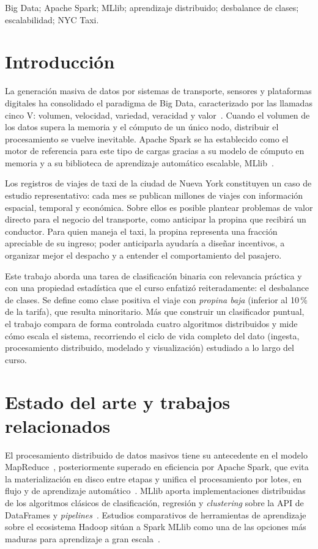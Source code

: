\documentclass[conference]{IEEEtran}
\begin{document}
\begin{IEEEkeywords}
Big Data; Apache Spark; MLlib; aprendizaje distribuido; desbalance de clases;
escalabilidad; NYC Taxi.
\end{IEEEkeywords}

\section{Introducción}
La generación masiva de datos por sistemas de transporte, sensores y plataformas
digitales ha consolidado el paradigma de Big Data, caracterizado por las llamadas
cinco V: volumen, velocidad, variedad, veracidad y valor~\cite{gandomi2015beyond}.
Cuando el volumen de los datos supera la memoria y el cómputo de un único nodo,
distribuir el procesamiento se vuelve inevitable. Apache Spark se ha establecido
como el motor de referencia para este
tipo de cargas gracias a su modelo de cómputo en memoria y a su biblioteca de
aprendizaje automático escalable, MLlib~\cite{zaharia2016spark,meng2016mllib}.

Los registros de viajes de taxi de la ciudad de Nueva York constituyen un caso de
estudio representativo: cada mes se publican millones de viajes con información
espacial, temporal y económica. Sobre ellos es posible plantear problemas de valor
directo para el negocio del transporte, como anticipar la propina que recibirá un
conductor. Para quien maneja el taxi, la propina representa una fracción
apreciable de su ingreso; poder anticiparla ayudaría a diseñar incentivos, a
organizar mejor el despacho y a entender el comportamiento del pasajero.

Este trabajo aborda una tarea de clasificación binaria con relevancia práctica y
con una propiedad estadística que el curso enfatizó reiteradamente: el desbalance
de clases. Se define como clase positiva el viaje con \emph{propina baja} (inferior
al 10\,\% de la tarifa), que resulta minoritario. Más que construir un clasificador
puntual, el trabajo compara de forma controlada cuatro algoritmos distribuidos y
mide cómo escala el sistema, recorriendo el ciclo de vida completo del dato
(ingesta, procesamiento distribuido, modelado y visualización) estudiado a lo
largo del curso.

\section{Estado del arte y trabajos relacionados}
El procesamiento distribuido de datos masivos tiene su antecedente en el modelo
MapReduce~\cite{dean2008mapreduce}, posteriormente superado en eficiencia por
Apache Spark, que evita la materialización en disco entre etapas y unifica el
procesamiento por lotes, en flujo y de aprendizaje automático~\cite{zaharia2016spark}.
MLlib aporta implementaciones distribuidas de los algoritmos clásicos de
clasificación, regresión y \emph{clustering} sobre la API de DataFrames y
\emph{pipelines}~\cite{meng2016mllib}. Estudios comparativos de herramientas de
aprendizaje sobre el ecosistema Hadoop sitúan a Spark MLlib como una de las
opciones más maduras para aprendizaje a gran escala~\cite{landset2015survey}.
\end{document}
